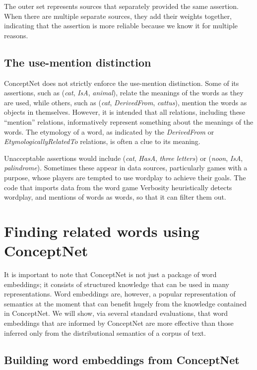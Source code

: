 \documentclass[letterpaper]{article}
\begin{document}
The outer set represents sources that separately provided the same
assertion. When there are multiple separate sources, they add their
weights together, indicating that the assertion is more reliable because
we know it for multiple reasons.


\subsection{The use-mention distinction}

ConceptNet does not strictly enforce the use-mention distinction. Some
of its assertions, such as (\emph{cat}, \emph{IsA}, \emph{animal}),
relate the meanings of the words as they are used, while others, such as
(\emph{cat}, \emph{DerivedFrom}, \emph{cattus}), mention the words as
objects in themselves. However, it is intended that all relations,
including these ``mention'' relations, informatively represent something
about the meanings of the words. The etymology of a word, as indicated
by the \emph{DerivedFrom} or \emph{EtymologicallyRelatedTo} relations,
is often a clue to its meaning.

Unacceptable assertions would include (\emph{cat}, \emph{HasA},
\emph{three letters}) or (\emph{noon}, \emph{IsA}, \emph{palindrome}).
Sometimes these appear in data sources, particularly games with a
purpose, whose players are tempted to use wordplay to achieve their
goals. The code that imports data from the word game Verbosity
heuristically detects wordplay, and mentions of words as words, so that
it can filter them out.


\section{Finding related words using ConceptNet}
\label{finding-related-words-using-conceptnet}

It is important to note that ConceptNet is not just a package of word
embeddings; it consists of structured knowledge that can be used in many
representations.  Word embeddings are, however, a popular representation of
semantics at the moment that can benefit hugely from the knowledge contained in
ConceptNet. We will show, via several standard evaluations, that word
embeddings that are informed by ConceptNet are more effective than those
inferred only from the distributional semantics of a corpus of text.

\subsection{Building word embeddings from ConceptNet}
\end{document}
